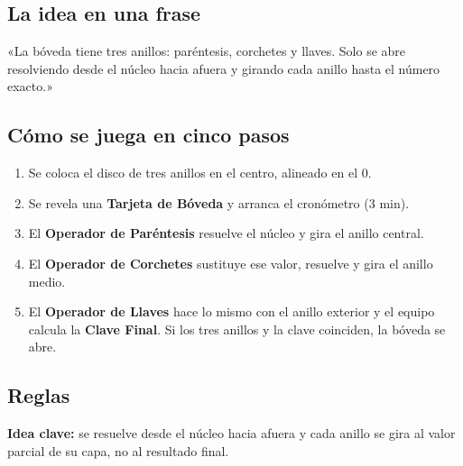 \documentclass[12pt, letterpaper]{article}
\begin{document}
\subsection{La idea en una frase}

\begin{cuadroextra}
  «La bóveda tiene tres anillos: paréntesis, corchetes y llaves. Solo se abre resolviendo desde el núcleo hacia afuera y girando cada anillo hasta el número exacto.»
\end{cuadroextra}

\subsection{Cómo se juega en cinco pasos}

\begin{enumerate}[leftmargin=*]
  \item Se coloca el disco de tres anillos en el centro, alineado en el $0$.
  \item Se revela una \textbf{Tarjeta de Bóveda} y arranca el cronómetro ($3$ min).
  \item El \textbf{Operador de Paréntesis} resuelve el núcleo y gira el anillo central.
  \item El \textbf{Operador de Corchetes} sustituye ese valor, resuelve y gira el anillo medio.
  \item El \textbf{Operador de Llaves} hace lo mismo con el anillo exterior y el equipo calcula la \textbf{Clave Final}. Si los tres anillos y la clave coinciden, la bóveda se abre.
\end{enumerate}

\subsection{Reglas}

\textbf{Idea clave:} se resuelve desde el núcleo hacia afuera y cada anillo se gira al valor parcial de su capa, no al resultado final.
\end{document}
